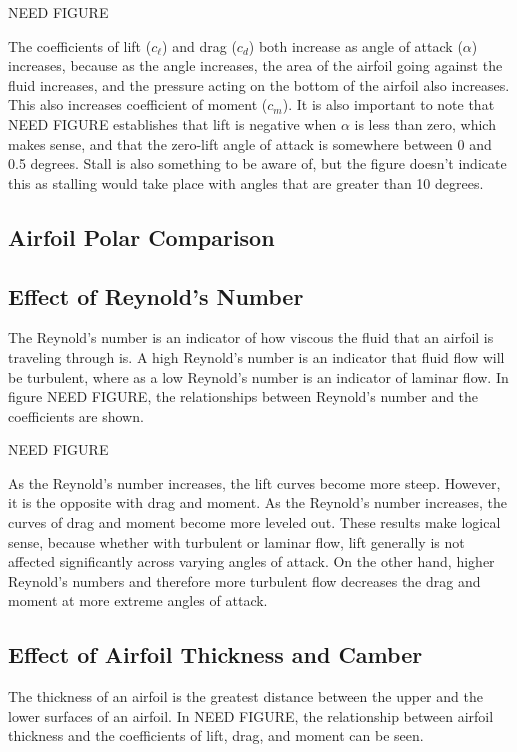 \documentclass{journal}
\begin{document}
	NEED FIGURE
	
	The coefficients of lift (\(c_\ell\)) and drag (\(c_d\)) both increase as angle of attack (\(\alpha\)) increases, because as the angle increases, the area of the airfoil going against the fluid increases, and the pressure acting on the bottom of the airfoil also increases. This also increases coefficient of moment (\(c_m\)). It is also important to note that NEED FIGURE establishes that lift is negative when \(\alpha\) is less than zero, which makes sense, and that the zero-lift angle of attack is somewhere between 0 and 0.5 degrees. Stall is also something to be aware of, but the figure doesn't indicate this as stalling would take place with angles that are greater than 10 degrees.
	
	\subsection{Airfoil Polar Comparison}
	
	\subsection{Effect of Reynold's Number}
	The Reynold's number is an indicator of how viscous the fluid that an airfoil is traveling through is. A high Reynold's number is an indicator that fluid flow will be turbulent, where as a low Reynold's number is an indicator of laminar flow. In figure NEED FIGURE, the relationships between Reynold's number and the coefficients are shown.
	
	NEED FIGURE
	
	As the Reynold's number increases, the lift curves become more steep. However, it is the opposite with drag and moment. As the Reynold's number increases, the curves of drag and moment become more leveled out. These results make logical sense, because whether with turbulent or laminar flow, lift generally is not affected significantly across varying angles of attack. On the other hand, higher Reynold's numbers and therefore more turbulent flow decreases the drag and moment at more extreme angles of attack.
	
	\subsection{Effect of Airfoil Thickness and Camber}
	The thickness of an airfoil is the greatest distance between the upper and the lower surfaces of an airfoil. In NEED FIGURE, the relationship between airfoil thickness and the coefficients of lift, drag, and moment can be seen.
	
\end{document}
